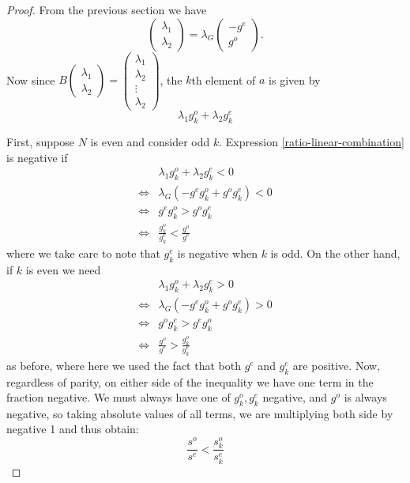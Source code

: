 \documentclass{article}
\theoremstyle{definition}
\theoremstyle{remark}
\numberwithin{equation}{section}
\begin{document}
\begin{proof}
From the previous section we have 
\[\begin{pmatrix} \lambda_1 \\ \lambda_2 \end{pmatrix} = \lambda_G \begin{pmatrix} -g^e \\ g^o \end{pmatrix}.\]
Now since $B \begin{pmatrix} \lambda_1 \\ \lambda_2 \end{pmatrix} = \begin{pmatrix} \lambda_1 \\ \lambda_2 \\ \vdots \\ \lambda_2 \end{pmatrix}$, the $k$th element of $a$ is given by 
\begin{equation}\label{ratio-linear-combination} \lambda_1 g_k^o + \lambda_2 g_k^e \end{equation}

First, suppose $N$ is even and consider odd $k$. Expression \ref{ratio-linear-combination} is negative if \begin{align*}
&\lambda_1 g_k^o + \lambda_2 g_k^e < 0\\
\iff & \lambda_G(-g^e g_k^o + g^o g_k^e) < 0 \\
\iff & g^eg_k^o > g^og_k^e\\
\iff & \frac{g_k^o}{g_k^e} < \frac{g^o}{g^e}
\end{align*} where we take care to note that $g_k^e$ is negative when $k$ is odd. On the other hand, if $k$ is even we need
\begin{align*}
&\lambda_1 g_k^o + \lambda_2 g_k^e > 0\\
\iff & \lambda_G(-g^e g_k^o + g^o g_k^e) > 0 \\
\iff & g^og_k^e > g^eg_k^o\\
\iff & \frac{g^o}{g^e} > \frac{g^o_k}{g^e_k}
\end{align*} as before, where here we used the fact that both $g^e$ and $g^e_k$ are positive.  Now, regardless of parity, on either side of the inequality we have one term in the fraction negative. We must always have one of $g^o_k, g^e_k$ negative, and $g^o$ is always negative, so taking absolute values of all terms, we are multiplying both side by negative 1 and thus obtain: 
\[ \frac{s^o}{s^e} < \frac{s^o_k}{s^e_k}\]
\end{proof}
\end{document}
